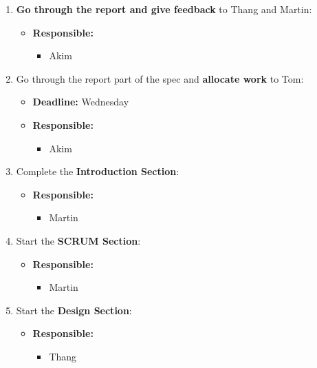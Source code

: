 \documentclass[12pt]{article}
\begin{document}
\begin{enumerate}
\def\labelenumi{\arabic{enumi}.}
\setcounter{enumi}{6}
\tightlist
\item
  \textbf{Go through the report and give feedback} to Thang and Martin:

  \begin{itemize}
  \tightlist
  \item
    \textbf{Responsible:}

    \begin{itemize}
    \tightlist
    \item
      Akim
    \end{itemize}
  \end{itemize}
  \newpage
\item
  Go through the report part of the spec and \textbf{allocate work} to
  Tom:

  \begin{itemize}
  \tightlist
  \item
    \textbf{Deadline:} Wednesday
  \item
    \textbf{Responsible:}

    \begin{itemize}
    \tightlist
    \item
      Akim
    \end{itemize}
  \end{itemize}
\item
  Complete the \textbf{Introduction Section}:

  \begin{itemize}
  \tightlist
  \item
    \textbf{Responsible:}

    \begin{itemize}
    \tightlist
    \item
      Martin
    \end{itemize}
  \end{itemize}
\item
  Start the \textbf{SCRUM Section}:

  \begin{itemize}
  \tightlist
  \item
    \textbf{Responsible:}

    \begin{itemize}
    \tightlist
    \item
      Martin
    \end{itemize}
  \end{itemize}
\item
  Start the \textbf{Design Section}:

  \begin{itemize}
  \tightlist
  \item
    \textbf{Responsible:}

    \begin{itemize}
    \tightlist
    \item
      Thang
    \end{itemize}
  \end{itemize}
\end{enumerate}
\end{document}
